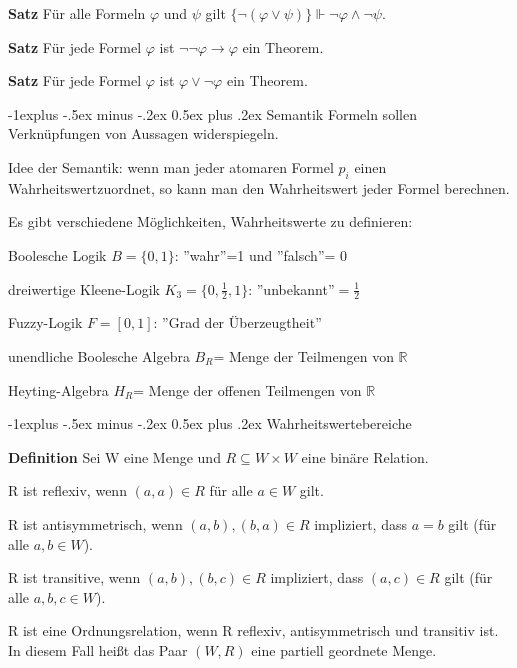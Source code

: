 \documentclass[a4paper]{article}
\makeatletter
\renewcommand{\note}[2]{\begin{noteBox} \textbf{#1} #2 \end{noteBox}}
\renewcommand{\subsection}{\@startsection{subsection}{2}{0mm}%
                {-1explus -.5ex minus -.2ex}%
                {0.5ex plus .2ex}%
                {\normalfont\normalsize\bfseries}}
\makeatother
\begin{document}
\begin{multicols}{3}
  \note{Satz}{Für alle Formeln $\varphi$ und $\psi$ gilt $\{\lnot(\varphi\vee\psi)\}\Vdash\lnot\varphi\wedge\lnot\psi$.}

  \note{Satz}{Für jede Formel $\varphi$ ist $\lnot\lnot\varphi\rightarrow\varphi$ ein Theorem.}

  \note{Satz}{Für jede Formel $\varphi$ ist $\varphi\vee\lnot\varphi$ ein Theorem.}

  \subsection{Semantik}
  Formeln sollen Verknüpfungen von Aussagen widerspiegeln.

  Idee der Semantik: wenn man jeder atomaren Formel $p_i$ einen Wahrheitswertzuordnet, so kann man den Wahrheitswert jeder Formel berechnen.

  Es gibt verschiedene Möglichkeiten, Wahrheitswerte zu definieren:
  \begin{itemize*}
    \item Boolesche Logik $B=\{0,1\}$: ''wahr''=1 und ''falsch''= 0
    \item dreiwertige Kleene-Logik $K_3=\{0,\frac{1}{2},1\}$: ''unbekannt''$=\frac{1}{2}$
    \item Fuzzy-Logik $F=[0,1]$: ''Grad der Überzeugtheit''
    \item unendliche Boolesche Algebra $B_R$= Menge der Teilmengen von $\mathbb{R}$
    \item Heyting-Algebra $H_R$= Menge der offenen Teilmengen von $\mathbb{R}$
  \end{itemize*}

  \subsection{Wahrheitswertebereiche}
  \note{Definition}{Sei W eine Menge und $R\subseteq W\times W$ eine binäre Relation.
    \begin{itemize*}
      \item R ist reflexiv, wenn $(a,a)\in R$ für alle $a\in W$ gilt.
      \item R ist antisymmetrisch, wenn $(a,b),(b,a)\in R$ impliziert, dass $a=b$ gilt (für alle $a,b\in W$).
      \item R ist transitive, wenn $(a,b),(b,c)\in R$ impliziert, dass $(a,c)\in R$ gilt (für alle $a,b,c\in W$).
      \item R ist eine Ordnungsrelation, wenn R reflexiv, antisymmetrisch und transitiv ist. In diesem Fall heißt das Paar $(W,R)$ eine partiell geordnete Menge.
    \end{itemize*}
  }


\end{multicols}
\end{document}
